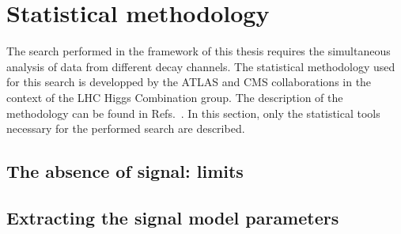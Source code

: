 \section{Statistical methodology}
The search performed in the framework of this thesis requires the simultaneous analysis of data from different decay channels. The statistical methodology used for this search is developped by the ATLAS and CMS collaborations in the context of the LHC Higgs Combination group. The description of the methodology can be found in Refs.~\cite{14,89,paper}. In this section, only the statistical tools necessary for the performed search are described. 

\subsection{The absence of signal: limits}

\subsection{Extracting the signal model parameters}


